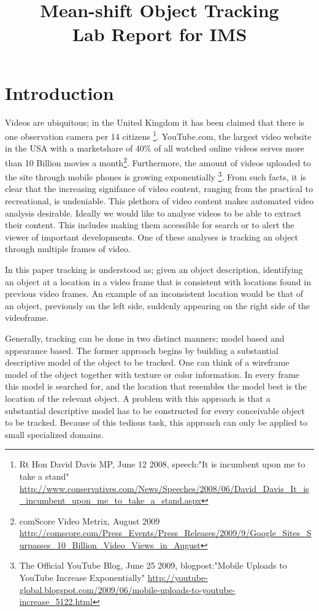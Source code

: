 \documentclass[a4paper,11pt]{article}
\title{Mean-shift Object Tracking\\ Lab Report for IMS}
\date{}
\begin{document}
\maketitle 

\section{Introduction}

Videos are ubiquitous; in the United Kingdom it has been claimed that there is one observation camera per 14 citizens \footnote{
Rt Hon David Davis MP, June 12 2008, speech:"It is incumbent upon me to take a stand" \url{http://www.conservatives.com/News/Speeches/2008/06/David_Davis_It_is_incumbent_upon_me_to_take_a_stand.aspx}}. YouTube.com, the largest video website in the USA with a marketshare of 40\% of all watched online videos serves more than 10 Billion movies a month\footnote{comScore Video Metrix, August 2009 \url{http://comscore.com/Press_Events/Press_Releases/2009/9/Google_Sites_Surpasses_10_Billion_Video_Views_in_August}}. Furthermore, the amount of videos uploaded to the site through mobile phones is growing exponentially \footnote{The Official YouTube Blog, June 25 2009, blogpost:"Mobile Uploads to YouTube Increase Exponentially"  \url{http://youtube-global.blogspot.com/2009/06/mobile-uploads-to-youtube-increase_5122.html}}. From such facts, it is clear that the increasing signifance of video content, ranging from the practical to recreational, is undeniable. This plethora of video content makes automated video analysis desirable. Ideally we would like to analyse videos to be able to extract their content. This includes making them accessible for search or to alert the viewer of important developments. One of these analyses is tracking an object through multiple frames of video.

In this paper tracking is understood as; given an object description, identifying an object at a location in a video frame that is consistent with locations found in previous video frames. An example of an inconsistent location would be that of an object, previously on the left side, suddenly appearing on the right side of the videoframe. 

Generally, tracking can be done in two distinct manners; model based and appearance based. The former approach begins by building a substantial descriptive model of the object to be tracked. One can think of a wireframe model of the object together with texture or color information. In every frame this model is searched for, and the location that resembles the model best is the location of the relevant object.  A problem with this approach is that a substantial descriptive model has to be constructed for every conceivable object to be tracked.  Because of this tedious task, this approach can only be applied to small specialized domains.  
\end{document}
